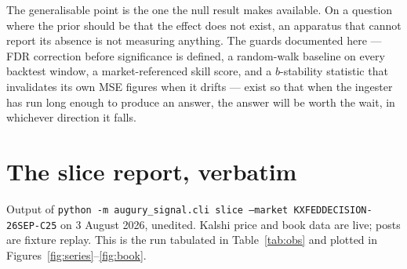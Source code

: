 \documentclass[11pt]{article}
\newcommand{\code}[1]{\texttt{\small #1}}
\begin{document}
The generalisable point is the one the null result makes available. On a
question where the prior should be that the effect does not exist, an apparatus
that cannot report its absence is not measuring anything. The guards documented
here --- FDR correction before significance is defined, a random-walk baseline on
every backtest window, a market-referenced skill score, and a
$b$-stability statistic that invalidates its own MSE figures when it drifts ---
exist so that when the ingester has run long enough to produce an answer, the
answer will be worth the wait, in whichever direction it falls.

\appendix

\section{The slice report, verbatim}
\label{app:slice}

Output of \code{python -m augury\_signal.cli slice --market KXFEDDECISION-26SEP-C25}
on 3 August 2026, unedited. Kalshi price and book data are live; posts are
fixture replay. This is the run tabulated in Table~\ref{tab:obs} and plotted in
Figures~\ref{fig:series}--\ref{fig:book}.
\end{document}
